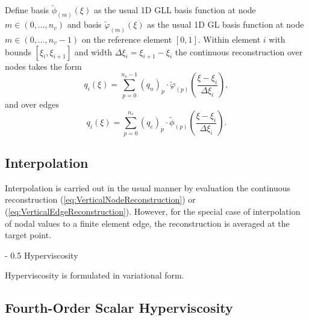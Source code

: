\documentclass{article}
\makeatletter
\renewcommand\section{\@startsection
  {section}{2}{0mm}%
  {-\baselineskip}%
  {0.5\baselineskip}%
  {\normalfont\Huge\bfseries}}%
\makeatother
\begin{document}
Define basis $\tilde{\phi}_{(m)}(\xi)$ as the usual 1D GLL basis function at node $m \in (0, \ldots, n_v)$ and basis $\tilde{\varphi}_{(m)}(\xi)$ as the usual 1D GL basis function at node $m \in (0, \ldots, n_v-1)$ on the reference element $[0,1]$.  Within element $i$ with bounds $[\xi_i, \xi_{i+1}]$ and width $\Delta \xi_i = \xi_{i+1} - \xi_i$ the continuous reconstruction over nodes takes the form
\begin{equation} \label{eq:VerticalNodeReconstruction}
q_i(\xi) = \sum_{p=0}^{n_v-1} (q_n)_p \cdot \tilde{\varphi}_{(p)}\!\left( \frac{\xi - \xi_i}{\Delta \xi_i} \right),
\end{equation} and over edges
\begin{equation} \label{eq:VerticalEdgeReconstruction}
q_i(\xi) = \sum_{p=0}^{n_v} (q_e)_p \cdot \tilde{\phi}_{(p)}\!\left( \frac{\xi - \xi_i}{\Delta \xi_i} \right).
\end{equation}

\subsection{Interpolation}

Interpolation is carried out in the usual manner by evaluation the continuous reconstruction (\ref{eq:VerticalNodeReconstruction}) or (\ref{eq:VerticalEdgeReconstruction}).  However, for the special case of interpolation of nodal values to a finite element edge, the reconstruction is averaged at the target point.

\section{Hyperviscosity}

Hyperviscosity is formulated in variational form.

\subsection{Fourth-Order Scalar Hyperviscosity} \label{sec:VariationalScalarHyperviscosity}
\end{document}
